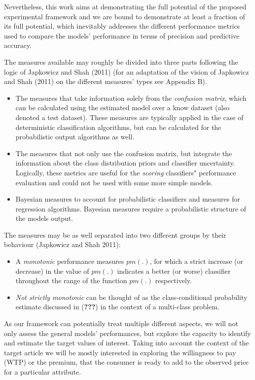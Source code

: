 \documentclass[11pt,]{article}
\providecommand{\tightlist}{%
  \setlength{\itemsep}{0pt}\setlength{\parskip}{0pt}}
\begin{document}
Nevertheless, this work aims at demonstrating the full potential of the
proposed experimental framework and we are bound to demonstrate at least
a fraction of its full potential, which inevitably addresses the
different performance metrics used to compare the models' performance in
terms of precision and predictive accuracy.

The measures available may roughly be divided into three parts following
the logic of Japkowicz and Shah (2011) (for an adaptation of the vision
of Japkowicz and Shah (2011) on the different measures' types see
Appendix B).

\begin{itemize}
\tightlist
\item
  The measures that take information solely from the \emph{confusion
  matrix}, which can be calculated using the estimated model over a know
  dataset (also denoted a test dataset). These measures are typically
  applied in the case of deterministic classification algorithms, but
  can be calculated for the probabilistic output algorithms as well.
\item
  The measures that not only use the confusion matrix, but integrate the
  information about the class distribution priors and classifier
  uncertainty. Logically, these metrics are useful for the
  \emph{scoring} classifiers" performance evaluation and could not be
  used with some more simple models.
\item
  Bayesian measures to account for probabilistic classifiers and
  measures for regression algorithms. Bayesian measures require a
  probabilistic structure of the models output.
\end{itemize}

The measures may be as well separated into two different groups by their
behaviour (Japkowicz and Shah 2011):

\begin{itemize}
\tightlist
\item
  A \emph{monotonic} performance measures \(pm(.)\), for which a strict
  increase (or decrease) in the value of \(pm(.)\) indicates a better
  (or worse) classifier throughout the range of the function \(pm(.)\)
  respectively.
\item
  \emph{Not strictly monotonic} can be thought of as the
  class-conditional probability estimate discussed in ({\textbf{???}})
  in the context of a multi-class problem.
\end{itemize}

As our framework can potentially treat multiple different aspects, we
will not only assess the general models' performances, but explore the
capacity to identify and estimate the target values of interest. Taking
into account the context of the target article we will be mostly
interested in exploring the willingness to pay (WTP) or the premium,
that the consumer is ready to add to the observed price for a particular
attribute.
\end{document}
